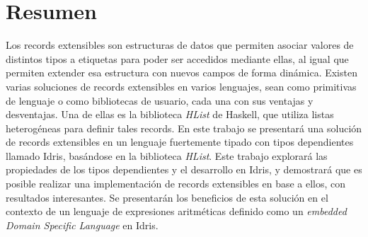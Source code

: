 
\chapter*{Resumen}

Los records extensibles son estructuras de datos que permiten asociar valores de distintos tipos a etiquetas para poder ser accedidos mediante ellas, al igual que permiten extender esa estructura con nuevos campos de forma dinámica. Existen varias soluciones de records extensibles en varios lenguajes, sean como primitivas de lenguaje o como bibliotecas de usuario, cada una con sus ventajas y desventajas. Una de ellas es la biblioteca \textit{HList} de Haskell, que utiliza listas heterogéneas para definir tales records. En este trabajo se presentará una solución de records extensibles en un lenguaje fuertemente tipado con tipos dependientes llamado Idris, basándose en la biblioteca \textit{HList}. Este trabajo explorará las propiedades de los tipos dependientes y el desarrollo en Idris, y demostrará que es posible realizar una implementación de records extensibles en base a ellos, con resultados interesantes. Se presentarán los beneficios de esta solución en el contexto de un lenguaje de expresiones aritméticas definido como un \textit{embedded Domain Specific Language} en Idris. 
